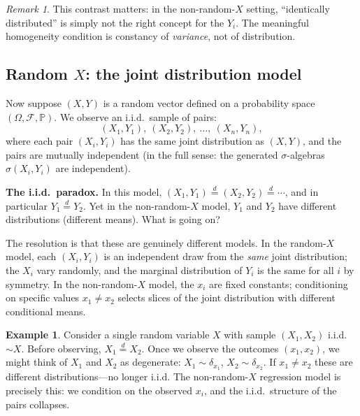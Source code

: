 \documentclass[a4paper,oneside,12pt]{extarticle}
\theoremstyle{plain}
\theoremstyle{definition}
\newtheorem{example}[proposition]{Example}
\theoremstyle{remark}
\newtheorem{remark}[proposition]{Remark}
\newcommand*{\mP}{\mathbb{P}}
\newcommand*{\mbF}{\mathcal{F}}
\begin{document}
\begin{remark}
This contrast matters: in the non-random-$X$ setting, ``identically
distributed'' is simply not the right concept for the $Y_i$. The
meaningful homogeneity condition is constancy of \emph{variance}, not
of distribution.
\end{remark}

\subsection{Random $X$: the joint distribution model}
\label{sec:randomX}

Now suppose $(X, Y)$ is a random vector defined on a probability space
$(\Omega, \mbF, \mP)$. We observe an i.i.d.\ sample of pairs:
\[
  (X_1, Y_1),\ (X_2, Y_2),\ \ldots,\ (X_n, Y_n),
\]
where each pair $(X_i, Y_i)$ has the same joint distribution as $(X, Y)$,
and the pairs are mutually independent (in the full sense: the generated
$\sigma$-algebras $\sigma(X_i, Y_i)$ are independent).

\textbf{The i.i.d.\ paradox.}
In this model, $(X_1, Y_1) \overset{d}{=} (X_2, Y_2) \overset{d}{=} \cdots$,
and in particular $Y_1 \overset{d}{=} Y_2$. Yet in the non-random-$X$ model,
$Y_1$ and $Y_2$ have different distributions (different means). What is
going on?

The resolution is that these are genuinely different models. In the
random-$X$ model, each $(X_i, Y_i)$ is an independent draw from the
\emph{same} joint distribution; the $X_i$ vary randomly, and the
marginal distribution of $Y_i$ is the same for all $i$ by symmetry.
In the non-random-$X$ model, the $x_i$ are fixed constants; conditioning
on specific values $x_1 \neq x_2$ selects slices of the joint distribution
with different conditional means.

\begin{example}
Consider a single random variable $X$ with sample $(X_1, X_2)$
i.i.d.$\sim X$. Before observing, $X_1 \overset{d}{=} X_2$. Once we
observe the outcomes $(x_1, x_2)$, we might think of $X_1$ and $X_2$
as degenerate: $X_1 \sim \delta_{x_1}$, $X_2 \sim \delta_{x_2}$. If
$x_1 \neq x_2$ these are different distributions---no longer i.i.d.
The non-random-$X$ regression model is precisely this: we condition on
the observed $x_i$, and the i.i.d.\ structure of the pairs collapses.
\end{example}
\end{document}
